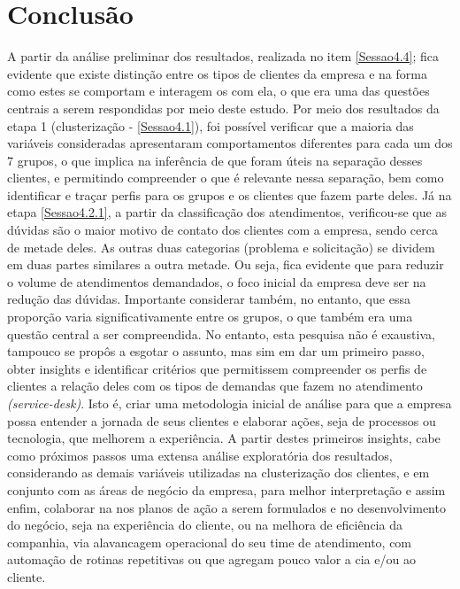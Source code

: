 \documentclass[twocolumn]{rbef}
\newcommand{\1}{\mathbbm{1}}
\begin{document}
\section{Conclusão} \label{Sessao5}
A partir da análise preliminar dos resultados, realizada no item \ref{Sessao4.4}; fica evidente que existe distinção entre os tipos de clientes da empresa e na forma como estes se comportam e interagem os com ela, o que era uma das questões centrais a serem respondidas por meio deste estudo.
Por meio dos resultados da etapa 1 (clusterização - \ref{Sessao4.1}), foi possível verificar que a maioria das variáveis consideradas apresentaram comportamentos diferentes para cada um dos 7 grupos, o que implica na inferência de que foram úteis na separação desses clientes, e permitindo compreender o que é relevante nessa separação, bem como identificar e traçar perfis para os grupos e os clientes que fazem parte deles.
Já na etapa \ref{Sessao4.2.1}, a partir da classificação dos atendimentos, verificou-se que as dúvidas são o maior motivo de contato dos clientes com a empresa, sendo cerca de metade deles. As outras duas categorias (problema e solicitação) se dividem em duas partes similares a outra metade. Ou seja, fica evidente que para reduzir o volume de atendimentos demandados, o foco inicial da empresa deve ser na redução das dúvidas. Importante considerar também, no entanto, que essa proporção varia significativamente entre os grupos, o que também era uma questão central a ser compreendida.
No entanto, esta pesquisa não é exaustiva, tampouco se propôs a esgotar o assunto, mas sim em dar um primeiro passo, obter insights e identificar critérios que permitissem compreender os perfis de clientes a relação deles com os tipos de demandas que fazem no atendimento \emph{(service-desk)}. Isto é, criar uma metodologia inicial de análise para que a empresa possa entender a jornada de seus clientes e elaborar ações, seja de processos ou tecnologia, que melhorem a experiência.
A partir destes primeiros insights, cabe como próximos passos uma extensa análise exploratória dos resultados, considerando as demais variáveis utilizadas na clusterização dos clientes, e em conjunto com as áreas de negócio da empresa, para melhor interpretação e assim enfim, colaborar na nos planos de ação a serem formulados e no desenvolvimento do negócio, seja na experiência do cliente, ou na melhora de eficiência da companhia, via alavancagem operacional do seu time de atendimento, com automação de rotinas repetitivas ou que agregam pouco valor a cia e/ou ao cliente.
\end{document}
